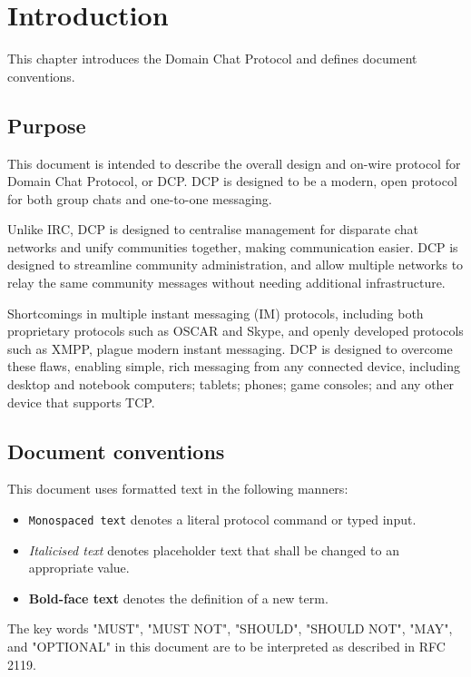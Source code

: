 \chapter{Introduction}
\label{chap:intro}
This chapter introduces the Domain Chat Protocol and defines document conventions.


\section{Purpose}
\sectionrule
This document is intended to describe the overall design and on-wire protocol
for Domain Chat Protocol, or DCP.  DCP is designed to be a modern, open protocol
for both group chats and one-to-one messaging.

Unlike IRC\cite{rfc1459}, DCP is designed to centralise management for disparate
chat networks and unify communities together, making communication easier.  DCP
is designed to streamline community administration, and allow multiple networks
to relay the same community messages without needing additional infrastructure.

Shortcomings in multiple instant messaging (IM) protocols, including both
proprietary protocols such as OSCAR and Skype, and openly developed protocols
such as XMPP\cite{xmpp}, plague modern instant messaging.  DCP is designed to
overcome these flaws, enabling simple, rich messaging from any connected device,
including desktop and notebook computers; tablets; phones; game consoles; and
any other device that supports TCP.


\section{Document conventions}
\sectionrule
This document uses formatted text in the following manners:

\begin{itemize}
\item
\texttt{Monospaced text} denotes a literal protocol command or typed input.

\item
\textit{Italicised text} denotes placeholder text that shall be changed to an 
appropriate value.

\item
\textbf{Bold-face text} denotes the definition of a new term.
\end{itemize}

The key words "MUST", "MUST NOT", "SHOULD", "SHOULD NOT", "MAY", and "OPTIONAL"
in this document are to be interpreted as described in RFC 2119\cite{rfc2119}.